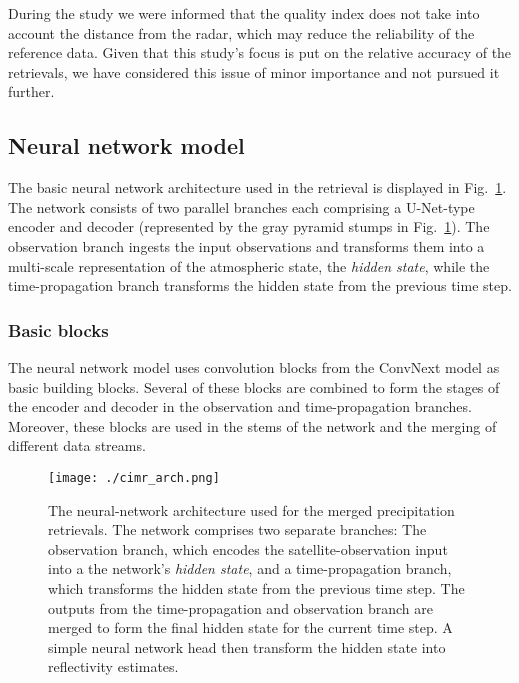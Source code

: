 \documentclass[11pt]{scrartcl}
\begin{document}
During the study we were informed that the quality index does not take into
account the distance from the radar, which may reduce the reliability of the
reference data. Given that this study's focus is put on the relative accuracy of
the retrievals, we have considered this issue of minor importance and not
pursued it further.

\subsection{Neural network model}
\label{sec:org623391a}


The basic neural network architecture used in the retrieval is displayed in
Fig.~\ref{fig:arch}. The network consists of two parallel branches each
comprising a U-Net-type encoder and decoder (represented by the gray pyramid
stumps in Fig.~\ref{fig:arch}). The observation branch ingests the input
observations and transforms them into a multi-scale representation of the
atmospheric state, the \textit{hidden state}, while the time-propagation branch
transforms the hidden state from the previous time step.

\subsubsection{Basic blocks}

The neural network model uses convolution blocks from the ConvNext \citep{liu22}
model as basic building blocks. Several of these blocks are combined to form the
stages of the encoder and decoder in the observation and time-propagation
branches. Moreover, these blocks are used in the stems of the network and the
merging of different data streams.

\begin{figure}
\begin{center}
  \texttt{[image: ./cimr\_arch.png]}
  \caption{
    The neural-network architecture used for the merged precipitation
    retrievals. The network comprises two separate branches: The observation
    branch, which encodes the satellite-observation input into a the network's
    \textit{hidden state}, and a time-propagation branch, which transforms the
    hidden state from the previous time step. The outputs from the
    time-propagation and observation branch are merged to form the final hidden
    state for the current time step. A simple neural network head then transform
    the hidden state into reflectivity estimates.
  }
  \label{fig:arch}
\end{center}
\end{figure}
\end{document}
